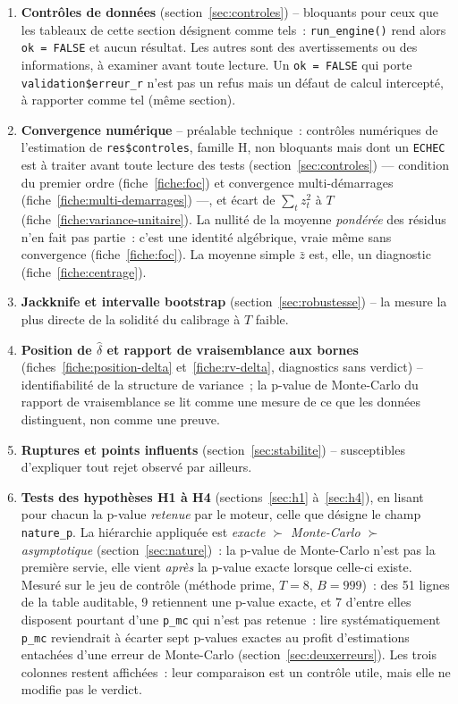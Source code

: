 \documentclass[a4paper,11pt]{article}
\newcommand{\code}[1]{\texttt{\small #1}}
\begin{document}
\begin{enumerate}[itemsep=2pt]
  \item \textbf{Contrôles de données} (section~\ref{sec:controles}) -- bloquants pour ceux que
        les tableaux de cette section désignent comme tels~: \code{run\_engine()} rend alors
        \code{ok = FALSE} et aucun résultat. Les autres sont des avertissements ou des
        informations, à examiner avant toute lecture. Un \code{ok = FALSE} qui porte
        \code{validation\$erreur\_r} n'est pas un refus mais un défaut de calcul intercepté,
        à rapporter comme tel (même section).
  \item \textbf{Convergence numérique} -- préalable technique~: contrôles numériques de
        l'estimation de \code{res\$controles}, famille H, non bloquants mais dont un
        \code{ECHEC} est à traiter avant toute lecture des tests (section~\ref{sec:controles})
        --- condition du premier
        ordre (fiche~\ref{fiche:foc}) et convergence multi-démarrages
        (fiche~\ref{fiche:multi-demarrages}) ---, et écart de $\sum_t z_t^2$ à $T$ (fiche~\ref{fiche:variance-unitaire}). La
        nullité de la moyenne \emph{pondérée} des résidus n'en fait pas partie~: c'est une
        identité algébrique, vraie même sans convergence (fiche~\ref{fiche:foc}). La moyenne
        simple $\bar z$ est, elle, un diagnostic (fiche~\ref{fiche:centrage}).
  \item \textbf{Jackknife et intervalle bootstrap} (section~\ref{sec:robustesse}) -- la mesure la
        plus directe de la solidité du calibrage à $T$ faible.
  \item \textbf{Position de $\hat\delta$ et rapport de vraisemblance aux bornes}
        (fiches~\ref{fiche:position-delta} et~\ref{fiche:rv-delta}, diagnostics sans verdict) --
        identifiabilité de la structure de variance~; la p-value de Monte-Carlo du rapport de
        vraisemblance se lit comme une mesure de ce que les données distinguent, non comme
        une preuve.
  \item \textbf{Ruptures et points influents} (section~\ref{sec:stabilite}) -- susceptibles
        d'expliquer tout rejet observé par ailleurs.
  \item \textbf{Tests des hypothèses H1 à H4} (sections~\ref{sec:h1} à~\ref{sec:h4}), en lisant
        pour chacun la p-value \emph{retenue} par le moteur, celle que désigne le champ
        \code{nature\_p}. La hiérarchie appliquée est \emph{exacte $\succ$ Monte-Carlo
        $\succ$ asymptotique} (section~\ref{sec:nature})~: la p-value de Monte-Carlo n'est
        pas la première servie, elle vient \emph{après} la p-value exacte lorsque celle-ci
        existe. Mesuré sur le jeu de contrôle (méthode prime, $T = 8$, $B = 999$)~: des 51
        lignes de la table auditable, 9 retiennent une p-value exacte, et 7 d'entre
        elles disposent pourtant d'une \code{p\_mc} qui n'est pas retenue~: lire
        systématiquement \code{p\_mc} reviendrait à écarter sept p-values exactes au profit
        d'estimations entachées d'une erreur de Monte-Carlo (section~\ref{sec:deuxerreurs}).
        Les trois colonnes restent affichées~: leur comparaison est un contrôle utile, mais
        elle ne modifie pas le verdict.
\end{enumerate}
\end{document}
